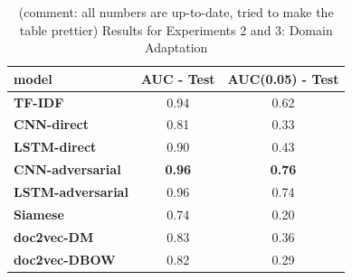 \documentclass{sigkddExp}
\begin{document}
\begin{table}[h]
    \begin{tabular}{ l | c | c}
    \toprule
    \textbf{model}
    & \textbf{AUC - Test}
    & \textbf{AUC(0.05) - Test}
    \\
    \toprule
    \textbf{TF-IDF}
    & 0.94
    & 0.62
    \\
    \cmidrule{1-1} 
    \textbf{CNN-direct}
    & 0.81
    & 0.33
    \\
    \cmidrule{1-1} 
    \textbf{LSTM-direct}
    & 0.90
    & 0.43
    \\
    \midrule
    \textbf{CNN-adversarial}
    & \textbf{0.96}
    & \textbf{0.76}
    \\
    \cmidrule{1-1} 
    \textbf{LSTM-adversarial}
    & 0.96
    & 0.74
    \\
    \midrule
    \textbf{Siamese}
    & 0.74
    & 0.20
    \\
    \cmidrule{1-1} 
    \textbf{doc2vec-DM}
    & 0.83
    & 0.36
    \\
    \cmidrule{1-1}
    \textbf{doc2vec-DBOW}
    & 0.82
    & 0.29    
    \\
    \bottomrule
    \end{tabular}
    \caption{{\color{red}(comment: all numbers are up-to-date, tried to make the table prettier) Results for Experiments 2 and 3: Domain Adaptation}}
    \label{tab:exp23}
\end{table}
\end{document}

